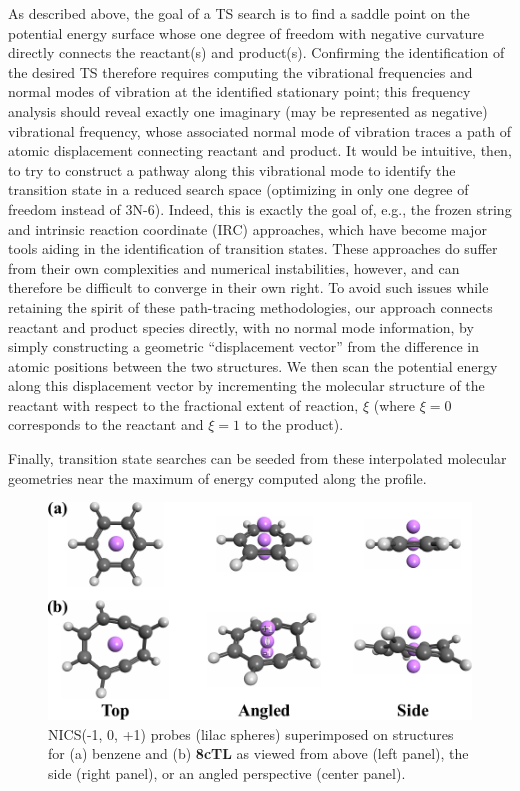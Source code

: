 \documentclass[aip,jcp,preprint,superscriptaddress,floatfix]{revtex4-1}
\begin{document}
As described above, the goal of a TS search is to find a saddle point on the
potential energy surface whose one degree of freedom with negative curvature
directly connects the reactant(s) and product(s).  Confirming the
identification of the desired TS therefore requires computing the vibrational
frequencies and normal modes of vibration at the identified stationary point;
this frequency analysis should reveal exactly one imaginary (may be represented
as negative) vibrational frequency, whose associated normal mode of vibration
traces a path of atomic displacement connecting reactant and product.  It would
be intuitive, then, to try to construct a pathway along this vibrational mode
to identify the transition state in a reduced search space (optimizing in only
one degree of freedom instead of 3N-6).  Indeed, this is exactly the goal of,
e.g., the frozen string\cite{x} and intrinsic reaction coordinate (IRC)\cite{x}
approaches, which have become major tools aiding in the identification of
transition states. These approaches do suffer from their own complexities and
numerical instabilities,\cite{x} however, and can therefore be difficult to
converge in their own right.  To avoid such issues while retaining the spirit
of these path-tracing methodologies, our approach connects reactant and product
species directly, with no normal mode information, by simply constructing a
geometric ``displacement vector'' from the difference in atomic positions between
the two structures.  We then scan the potential energy along this displacement
vector by incrementing the molecular structure of the reactant with respect to
the fractional extent of reaction, $\xi$ (where $\xi = 0$ corresponds to the
reactant and $\xi = 1$ to the product).  

Finally, transition state searches can
be seeded from these interpolated molecular geometries near the maximum of
energy computed along the profile.

\begin{figure}[ht!p]
\includegraphics[width=\textwidth]{includes/nics-probes.pdf}
\caption[Novel scheme for uniquely placing NICS probes]{NICS(-1, 0, +1) probes
(lilac spheres) superimposed on structures for (a) benzene and (b) {\bf 8cTL}
as viewed from above (left panel), the side (right panel), or an angled
perspective (center panel).}
\label{fig:nics-probes}
\end{figure}
\end{document}
